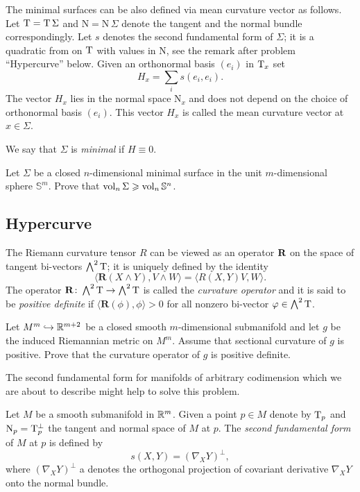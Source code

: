 The minimal surfaces can be also defined via mean curvature vector as follows.
Let $\mathrm{T}=\mathrm{T}\,\Sigma$ and $\mathrm{N}=\mathrm{N}\,\Sigma$ denote the tangent and the normal bundle correspondingly.
Let $s$ denotes the second fundamental form of $\Sigma$;
it is a quadratic from on $\mathrm{T}$ with values in $\mathrm{N}$,
see the remark after problem ``Hypercurve'' below. 
Given an orthonormal basis $(e_i)$ in $\mathrm{T}_x$ set 
$$H_x=\sum_i s(e_i,e_i).$$
The vector $H_x$ lies in the normal space $\mathrm{N}_x$
and does not depend on the choice of orthonormal basis $(e_i)$.
This vector $H_x$ is called the mean curvature vector at $x\in \Sigma$. 

We say that $\Sigma$ is \emph{minimal} if $H\equiv 0$.

\begin{pr}
Let $\Sigma$ be a closed $n$-dimensional 
minimal surface
in the unit $m$-dimensional sphere $\mathbb{S}^m$.
Prove that
$\operatorname{\rm vol}\nolimits_n \Sigma\geqslant \operatorname{\rm vol}\nolimits_n \mathbb{S}^n$.
\end{pr}

\subsection*{Hypercurve}
\label{codim=2}

The Riemann curvature tensor $R$
can be viewed as an operator $\text{\bf R}$ on the space of tangent bi-vectors $\bigwedge^2 \mathrm{T}$;
it is uniquely defined by the identity
$$\langle\mathbf{R}(X\wedge Y),V\wedge W\rangle
=
\langle R(X,Y)V,W\rangle.$$
The operator $\mathbf{R}\colon\bigwedge^2 \mathrm{T}\to \bigwedge^2 \mathrm{T}$ is called the \emph{curvature operator} and it is said to be {}\emph{positive definite} if
$\langle\mathbf{R}(\phi),\phi\rangle>0$ for all nonzero
bi-vector $\varphi\in\bigwedge^2 \mathrm{T}$.


\begin{pr}
Let $M^m\hookrightarrow \mathbb{R}^{m+2}$ be a closed smooth $m$-dimensional
submanifold and let  $g$ be the  induced Riemannian metric on $M^m$.
Assume that sectional curvature of $g$ is positive.
Prove that the curvature operator of $g$ is positive definite.
\end{pr}

The second fundamental form for manifolds of arbitrary codimension which we are about to describe might help to solve this problem.

Let $M$ be a smooth submanifold in $\mathbb{R}^m$.
Given a point $p\in M$ denote by $\mathrm{T}_p$ and $\mathrm{N}_p=\mathrm{T}_p^\bot$
the tangent and normal space of $M$ at $p$.
The \emph{second fundamental form}\label{page:second fundamental form} of $M$ at $p$ is defined by 
\[s(X,Y)=(\nabla_X Y)^\bot,\]
where $(\nabla_X Y)^\bot$ a denotes the orthogonal projection of covariant derivative $\nabla_X Y$ onto the normal bundle.

